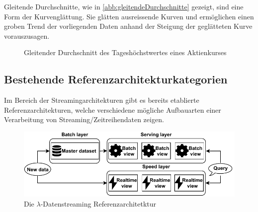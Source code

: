 Gleitende Durchschnitte, wie in \autoref{abb:gleitendeDurchschnitte} gezeigt, sind eine Form der Kurvenglättung. Sie glätten ausreissende Kurven und ermöglichen einen groben Trend der vorliegenden Daten anhand der Steigung der geglätteten Kurve vorauszusagen.
\begin{figure}[H]
\centering
{}
\caption{Gleitender Durchschnitt des Tageshöchstwertes eines Aktienkurses}
\label{abb:gleitendeDurchschnitte}
\end{figure}

\subsection{Bestehende Referenzarchitekturkategorien}\label{chap:bestehende_ras}
Im Bereich der Streamingarchitekturen gibt es bereits etablierte Referenzarchitekturen, welche verschiedene mögliche Aufbauarten einer Verarbeitung von Streaming/Zeitreihendaten zeigen.

\begin{figure}[H]
\centering
\includegraphics[width=\textwidth]{graphics/Lambda-Reference-Architecture.pdf}
\caption[Die $\lambda$-Datenstreaming Referenzarchitetktur]{Die $\lambda$-Datenstreaming Referenzarchitetktur\footnotemark}
\label{abb:LambdaStreaming}
\end{figure}

